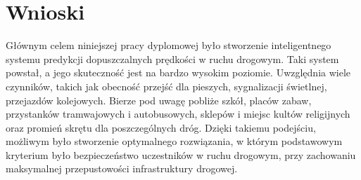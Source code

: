 \chapter{Wnioski}
\label{cha:wnioski}

Głównym celem niniejszej pracy dyplomowej było stworzenie inteligentnego systemu predykcji dopuszczalnych prędkości w ruchu drogowym. Taki system powstał, a jego skuteczność jest na bardzo wysokim poziomie. Uwzględnia wiele czynników, takich jak obecność przejść dla pieszych, sygnalizacji świetlnej, przejazdów kolejowych. Bierze pod uwagę pobliże szkół, placów zabaw, przystanków tramwajowych i autobusowych, sklepów i miejsc kultów religijnych oraz promień skrętu dla poszczególnych dróg. Dzięki takiemu podejściu, możliwym było stworzenie optymalnego rozwiązania, w którym podstawowym kryterium było bezpieczeństwo uczestników w ruchu drogowym, przy zachowaniu maksymalnej przepustowości infrastruktury drogowej.
